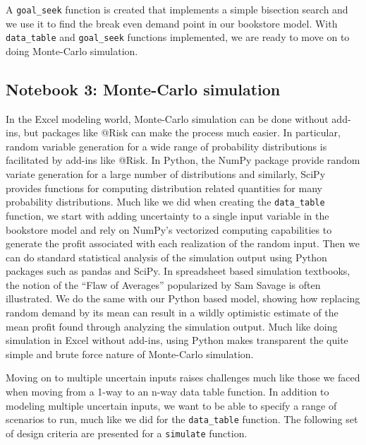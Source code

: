 \documentclass[ited,blindrev]{informs3}              %
\newcommand{\code}[1]{\texttt{#1}}
\begin{document}
A \code{goal\_seek} function is created that implements a simple bisection search and we use it to find the break even demand point in our bookstore model. With \code{data\_table} and \code{goal\_seek} functions implemented, we are ready to move on to doing Monte-Carlo simulation.

\subsection{Notebook 3: Monte-Carlo simulation}

In the Excel modeling world, Monte-Carlo simulation can be done without add-ins, but packages like @Risk \cite{RISKRiskAnalysis} can make the process much easier. In particular, random variable generation for a wide range of probability distributions is facilitated by add-ins like @Risk. In Python, the NumPy package provide random variate generation for a large number of distributions and similarly, SciPy provides functions for computing distribution related quantities for many probability distributions. Much like we did when creating the \code{data\_table} function, we start with adding uncertainty to a single input variable in the bookstore model and rely on NumPy's vectorized computing capabilities to generate the profit associated with each realization of the random input. Then we can do standard statistical analysis of the simulation output using Python packages such as pandas and SciPy. In spreadsheet based simulation textbooks, the notion of the ``Flaw of Averages'' popularized by Sam Savage \cite{savageFlawAveragesWhy2012} is often illustrated. We do the same with our Python based model, showing how replacing random demand by its mean can result in a wildly optimistic estimate of the mean profit found through analyzing the simulation output. Much like doing simulation in Excel without add-ins, using Python makes transparent the quite simple and brute force nature of Monte-Carlo simulation.

Moving on to multiple uncertain inputs raises challenges much like those we faced when moving from a 1-way to an n-way data table function. In addition to modeling multiple uncertain inputs, we want to be able to specify a range of scenarios to run, much like we did for the \code{data\_table} function. The following set of design criteria are presented for a \code{simulate} function.
\end{document}
